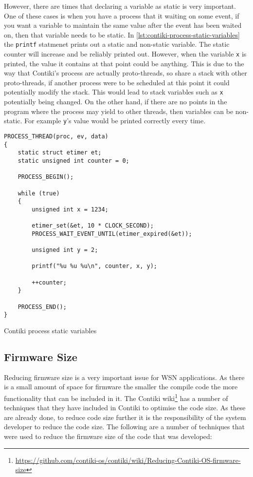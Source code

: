 However, there are times that declaring a variable as static is very important. One of these cases is when you have a process that it waiting on some event, if you want a variable to maintain the same value after the event has been waited on, then that variable needs to be static. In \autoref{lst:contiki-process-static-variables} the \verb|printf| statmenet prints out a static and non-static variable. The static counter will increase and be reliably printed out. However, when the variable \verb|x| is printed, the value it contains at that point could be anything. This is due to the way that Contiki's process are actually proto-threads, so share a stack with other proto-threads, if another process were to be scheduled at this point it could potentially modify the stack. This would lead to stack variables such as \verb|x| potentially being changed. On the other hand, if there are no points in the program where the process may yield to other threads, then variables can be non-static. For example \verb|y|'s value would be printed correctly every time.

\begin{listing}[H]
\begin{verbatim}
PROCESS_THREAD(proc, ev, data)
{
	static struct etimer et;
	static unsigned int counter = 0;

	PROCESS_BEGIN();

	while (true)
	{
		unsigned int x = 1234;

		etimer_set(&et, 10 * CLOCK_SECOND);
		PROCESS_WAIT_EVENT_UNTIL(etimer_expired(&et));

		unsigned int y = 2;

		printf("%u %u %u\n", counter, x, y);

		++counter;
	}

	PROCESS_END();
}
\end{verbatim}
\caption{Contiki process static variables}
\label{lst:contiki-process-static-variables}
\end{listing}

\subsection{Firmware Size}

Reducing firmware size is a very important issue for WSN applications. As there is a small amount of space for firmware \cite{?} the smaller the compile code the more functionality that can be included in it. The Contiki wiki\footnote{\url{https://github.com/contiki-os/contiki/wiki/Reducing-Contiki-OS-firmware-size}} has a number of techniques that they have included in Contiki to optimise the code size. As these are already done, to reduce code size further it is the responsibility of the system developer to reduce the code size. The following are a number of techniques that were used to reduce the firmware size of the code that was developed:

